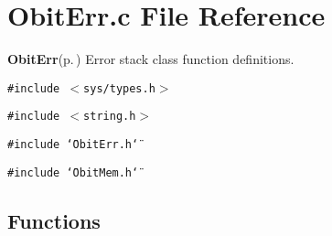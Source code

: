 \section{Obit\-Err.c File Reference}
\label{ObitErr_8c}
{\bf Obit\-Err}{\rm (p.\,\pageref{structObitErr})} Error stack class function definitions. 

{\tt \#include $<$sys/types.h$>$}\par
{\tt \#include $<$string.h$>$}\par
{\tt \#include \char`\"{}Obit\-Err.h\char`\"{}}\par
{\tt \#include \char`\"{}Obit\-Mem.h\char`\"{}}\par
\subsection*{Functions}
